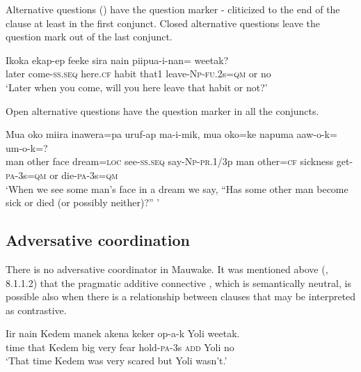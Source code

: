 Alternative questions () have the question marker - cliticized to the end of the clause at least in the first conjunct. Closed alternative questions leave the question mark out of the last conjunct. 

\ea%
\label{ex:8:x1386}
\gll Ikoka  ekap-ep  feeke  sira  nain  piipua-i-nan=   weetak?\\
later  come-\textsc{ss}.\textsc{seq}  here.\textsc{cf}  habit  that1  leave-\textsc{Np}-\textsc{fu}.2s=\textsc{qm} or  no\\
\glt`Later when you come, will you here leave that habit or not?'
\z


Open alternative questions have the question marker in all the conjuncts.

\ea%
\label{ex:8:x1384}
\gll Mua  oko  miira  inawera=pa  uruf-ap  ma-i-mik, mua  oko=ke  napuma  aaw-o-k=    um-o-k=?\\
man  other  face  dream=\textsc{loc}  see-\textsc{ss}.\textsc{seq}  say-\textsc{Np}-\textsc{pr}.1/3p man  other=\textsc{cf} sickness  get-\textsc{pa}-3s=\textsc{qm}  or  die-\textsc{pa}-3s=\textsc{qm}\\
\glt`When we see some man's face in a dream we say, ``Has some other man become sick or died (or possibly neither)?'' '
\z


\subsection{Adversative coordination} \label{sec:8.1.3}

There is no adversative coordinator in Mauwake. It was mentioned above  (, 8.1.1.2) that the pragmatic additive connective , which is semantically neutral, is possible also when there is a relationship between clauses that may be interpreted as contrastive. 

\ea%
\label{ex:8:x1388}
\gll Iir  nain  Kedem  manek  akena  keker  op-a-k   Yoli  weetak.\\
time  that  Kedem  big  very  fear  hold-\textsc{pa}-3s \textsc{add}  Yoli  no \\
\glt`That time Kedem was very scared but Yoli wasn't.'
\z


